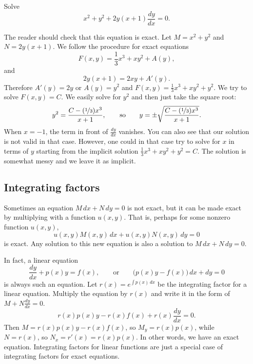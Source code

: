 \begin{example} \label{exact:exampleabove}
Solve
\begin{equation*}
x^2+y^2 + 2y(x+1) \frac{dy}{dx} = 0 .
\end{equation*}

The reader should check that this equation is exact.
Let $M= x^2+y^2$ and $N=2y(x+1)$.
We follow the procedure for exact equations
\begin{equation*}
F(x,y) = \frac{1}{3}x^3 + xy^2 + A(y) ,
\end{equation*}
and
\begin{equation*}
2y(x+1) = 2xy + A'(y) .
\end{equation*}
Therefore $A'(y) = 2y$ or $A(y) = y^2$ and $F(x,y) = \frac{1}{3}x^3 + xy^2 +
y^2$.
We try to solve $F(x,y) = C$.  We easily solve for $y^2$ and then just take
the square root:
\begin{equation*}
y^2 = \frac{C-(\nicefrac{1}{3})x^3}{x+1},
\qquad \text{so} \qquad
y = \pm \sqrt{\frac{C-(\nicefrac{1}{3})x^3}{x+1}} .
\end{equation*}
When $x=-1$, the term in front of $\frac{dy}{dx}$ vanishes.  You can also
see that our solution is not valid in that case.  However, one could in that
case try to solve for $x$ in terms of $y$ starting from the implicit
solution $\frac{1}{3}x^3 + xy^2 + y^2 = C$.  The solution is 
somewhat messy and we leave it as implicit.
\end{example}

\subsection{Integrating factors}

Sometimes an equation $M\, dx + N \, dy = 0$ is not exact, but it can be
made exact by multiplying with a function $u(x,y)$.  That is, perhaps
for some nonzero function $u(x,y)$,
\begin{equation*}
u(x,y) M(x,y) \, dx + u(x,y) N(x,y) \, dy = 0
\end{equation*}
is exact.  Any solution to this new equation is also a solution to
$M\, dx + N \, dy = 0$.

In fact, a linear equation
\begin{equation*}
\frac{dy}{dx} + p(x) y = f(x), \qquad
\text{or} \qquad
\bigl( p(x) y - f(x) \bigr)\, dx +  dy  = 0
\end{equation*}
is always such an equation.  Let $r(x) = e^{\int p(x)\,dx}$ be the
integrating factor for a linear equation.  Multiply the equation by $r(x)$
and write it in the form of $M + N \frac{dy}{dx} = 0$.
\begin{equation*}
r(x) p(x) y - r(x) f(x) + r(x) \frac{dy}{dx} = 0 .
\end{equation*}
Then $M = r(x) p(x) y - r(x) f(x)$, so
$M_y = r(x) p(x)$, while $N = r(x)$, so
$N_x = r'(x) = r(x) p(x)$.  In other words, we have an exact equation.
Integrating
factors for linear functions are just a special case of integrating
factors for exact equations.

